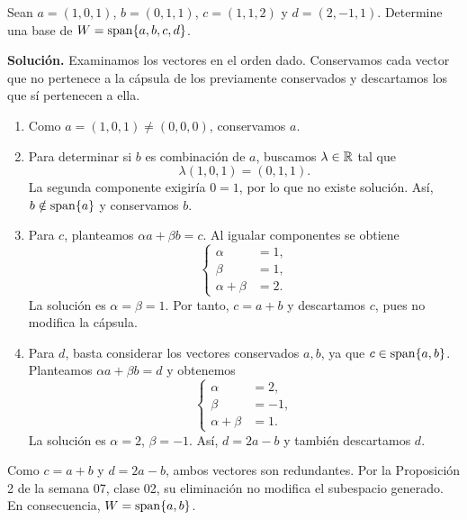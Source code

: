 \documentclass[compacto,10pt]{pubciencias-notas}
\begin{document}
\begin{ejem}
    Sean $a=(1,0,1)$, $b=(0,1,1)$, $c=(1,1,2)$ y $d=(2,-1,1)$.
    Determine una base de $W=\operatorname{span}\{a,b,c,d\}$.

    \textbf{Solución.} Examinamos los vectores en el orden dado.
    Conservamos cada vector que no pertenece a la cápsula de los
    previamente conservados y descartamos los que sí pertenecen a ella.
    \begin{enumerate}
        \item Como $a=(1,0,1)\ne(0,0,0)$, conservamos $a$.
        \item Para determinar si $b$ es combinación de $a$, buscamos
              $\lambda\in\mathbb{R}$ tal que
              \[
                  \lambda(1,0,1)=(0,1,1).
              \]
              La segunda componente exigiría $0=1$, por lo que no existe
              solución. Así, $b\notin\operatorname{span}\{a\}$ y conservamos $b$.
        \item Para $c$, planteamos $\alpha a+\beta b=c$. Al igualar
              componentes se obtiene
              \[
                  \left\{\begin{aligned}
                      \alpha&=1,\\\beta&=1,\\\alpha+\beta&=2.
                  \end{aligned}\right.
              \]
              La solución es $\alpha=\beta=1$. Por tanto, $c=a+b$ y
              descartamos $c$, pues no modifica la cápsula.
        \item Para $d$, basta considerar los vectores conservados $a,b$,
              ya que $c\in\operatorname{span}\{a,b\}$. Planteamos
              $\alpha a+\beta b=d$ y obtenemos
              \[
                  \left\{\begin{aligned}
                      \alpha&=2,\\\beta&=-1,\\\alpha+\beta&=1.
                  \end{aligned}\right.
              \]
              La solución es $\alpha=2$, $\beta=-1$. Así, $d=2a-b$ y
              también descartamos $d$.
    \end{enumerate}
    Como $c=a+b$ y $d=2a-b$, ambos vectores son redundantes. Por la
    Proposición 2 de la semana 07, clase 02,
    su eliminación no modifica el subespacio generado.
    En consecuencia, $W=\operatorname{span}\{a,b\}$.


\end{ejem}
\end{document}
